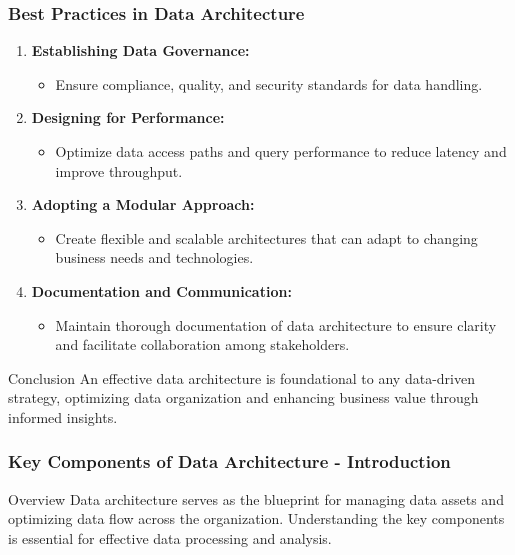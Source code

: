\documentclass[aspectratio=169]{beamer}
\begin{document}
\begin{frame}[fragile]
    \frametitle{Best Practices in Data Architecture}
    \begin{enumerate}
        \item \textbf{Establishing Data Governance:}
        \begin{itemize}
            \item Ensure compliance, quality, and security standards for data handling.
        \end{itemize}

        \item \textbf{Designing for Performance:}
        \begin{itemize}
            \item Optimize data access paths and query performance to reduce latency and improve throughput.
        \end{itemize}

        \item \textbf{Adopting a Modular Approach:}
        \begin{itemize}
            \item Create flexible and scalable architectures that can adapt to changing business needs and technologies.
        \end{itemize}

        \item \textbf{Documentation and Communication:}
        \begin{itemize}
            \item Maintain thorough documentation of data architecture to ensure clarity and facilitate collaboration among stakeholders.
        \end{itemize}
    \end{enumerate}

    \begin{block}{Conclusion}
        An effective data architecture is foundational to any data-driven strategy, optimizing data organization and enhancing business value through informed insights.
    \end{block}
\end{frame}

\begin{frame}[fragile]
    \frametitle{Key Components of Data Architecture - Introduction}
    \begin{block}{Overview}
        Data architecture serves as the blueprint for managing data assets and optimizing data flow across the organization. 
        Understanding the key components is essential for effective data processing and analysis.
    \end{block}
\end{frame}
\end{document}
